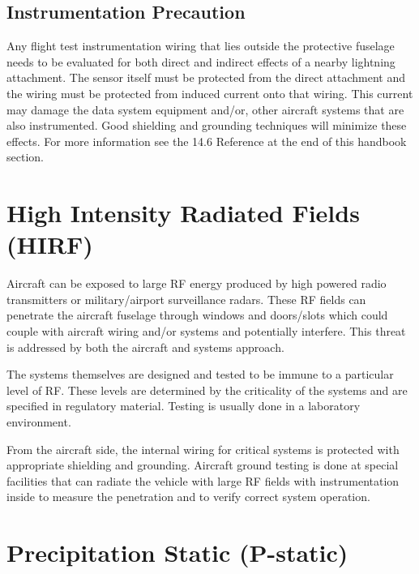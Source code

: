 \documentclass[
]{book}
\begin{document}
\hypertarget{instrumentation-precaution}{%
\subsection{Instrumentation Precaution}\label{instrumentation-precaution}}

Any flight test instrumentation wiring that lies outside the protective fuselage
needs to be evaluated for both direct and indirect effects of a nearby lightning
attachment. The sensor itself must be protected from the direct attachment and
the wiring must be protected from induced current onto that wiring. This current
may damage the data system equipment and/or, other aircraft systems that are
also instrumented. Good shielding and grounding techniques will minimize these
effects. For more information see the 14.6 Reference at the end of this handbook
section.

\hypertarget{high-intensity-radiated-fields-hirf}{%
\section{High Intensity Radiated Fields (HIRF)}\label{high-intensity-radiated-fields-hirf}}

Aircraft can be exposed to large RF energy produced by high powered radio
transmitters or military/airport surveillance radars. These RF fields can
penetrate the aircraft fuselage through windows and doors/slots which could
couple with aircraft wiring and/or systems and potentially interfere. This
threat is addressed by both the aircraft and systems approach.

The systems themselves are designed and tested to be immune to a particular
level of RF. These levels are determined by the criticality of the systems and
are specified in regulatory material. Testing is usually done in a laboratory
environment.

From the aircraft side, the internal wiring for critical systems is protected
with appropriate shielding and grounding. Aircraft ground testing is done at
special facilities that can radiate the vehicle with large RF fields with
instrumentation inside to measure the penetration and to verify correct system
operation.

\hypertarget{precipitation-static-p-static}{%
\section{Precipitation Static (P-static)}\label{precipitation-static-p-static}}
\end{document}
